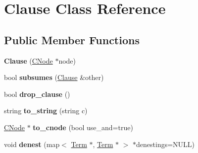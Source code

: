 \hypertarget{classClause}{\section{\-Clause \-Class \-Reference}
\label{classClause}
}
\subsection*{\-Public \-Member \-Functions}
\begin{DoxyCompactItemize}
\item 
\hypertarget{classClause_a36f5d7a9f0d9ec42766c17fbf1130003}{{\bfseries \-Clause} (\hyperlink{classCNode}{\-C\-Node} $\ast$node)}\label{classClause_a36f5d7a9f0d9ec42766c17fbf1130003}

\item 
\hypertarget{classClause_a6b06a55baada1e60a6d7e4a7a299f61b}{bool {\bfseries subsumes} (\hyperlink{classClause}{\-Clause} \&other)}\label{classClause_a6b06a55baada1e60a6d7e4a7a299f61b}

\item 
\hypertarget{classClause_a7db0ab185dcf82f240d08a651b4f0a93}{bool {\bfseries drop\-\_\-clause} ()}\label{classClause_a7db0ab185dcf82f240d08a651b4f0a93}

\item 
\hypertarget{classClause_a2f75f195619ff5e211fc347f5505a963}{string {\bfseries to\-\_\-string} (string c)}\label{classClause_a2f75f195619ff5e211fc347f5505a963}

\item 
\hypertarget{classClause_a966d45e9babc2d296eac53a0b3721f06}{\hyperlink{classCNode}{\-C\-Node} $\ast$ {\bfseries to\-\_\-cnode} (bool use\-\_\-and=true)}\label{classClause_a966d45e9babc2d296eac53a0b3721f06}

\item 
\hypertarget{classClause_a50d3423d651ccb8572608b87983478b2}{void {\bfseries denest} (map$<$ \hyperlink{classTerm}{\-Term} $\ast$, \hyperlink{classTerm}{\-Term} $\ast$ $>$ $\ast$denestings=\-N\-U\-L\-L)}\label{classClause_a50d3423d651ccb8572608b87983478b2}

\end{DoxyCompactItemize}
